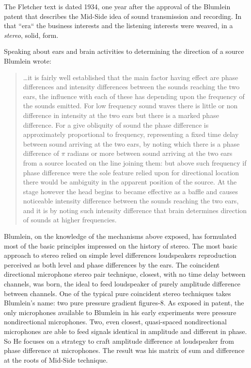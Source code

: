 \documentclass{article}
\begin{document}
The Fletcher \cite{hf34} text is dated 1934, one year after the approval of the Blumlein patent that describes the Mid-Side idea of sound transmission and recording. In that “era“ the business interests and the listening interests were weaved, in a \emph{stereo}, solid, form. 

Speaking about ears and brain activities to determining the direction of a source Blumlein wrote: 

\begin{quotation}
…it is fairly well established that the main factor having effect are phase
differences and intensity differences between the sounds reaching the two ears,
the influence with each of these has depending upon the frequency of the sounds
emitted. For low frequency sound waves there is little or non difference in
intensity at the two ears but there is a marked phase difference. For a give
obliquity of sound the phase difference is approximately proportional to
frequency, representing a fixed time delay between sound arriving at the two
ears, by noting which there is a phase difference of $\pi$ radians or more between
sound arriving at the two ears from a source located on the line joining them:
but above such frequency if phase difference were the sole feature relied upon
for directional location there would be ambiguity in the apparent position of
the source. At the stage however the head begins to became effective as a baffle
and causes noticeable intensity difference between the sounds reaching the two
ears, and it is by noting such intensity difference that brain determines
direction of sounds at higher frequencies. \cite{ab58}
\end{quotation}

Blumlein, on the knowledge of the mechanisms above exposed, has formulated most of the basic principles impressed on the history of stereo. The most basic approach to stereo relied on simple level differences loudspeakers reproduction perceived as both level and phase differences by the ears. The coincident directional microphone stereo pair technique, closest, with no time delay between channels, was born, the ideal to feed loudspeaker of purely amplitude difference between channels. One of the typical pure coincident stereo techniques takes Blumlein's name: two pure pressure gradient figures-8. 
As exposed in patent, the only microphones available to Blumlein in his early experiments were pressure nondirectional microphones. Two, even closest, quasi-spaced nondirectional microphones are able to feed signals identical in amplitude and different in phase. So He focuses on a strategy to craft amplitude difference at loudspeaker from phase difference at microphones. The result was his matrix of sum and difference at the roots of Mid-Side technique.
\end{document}
